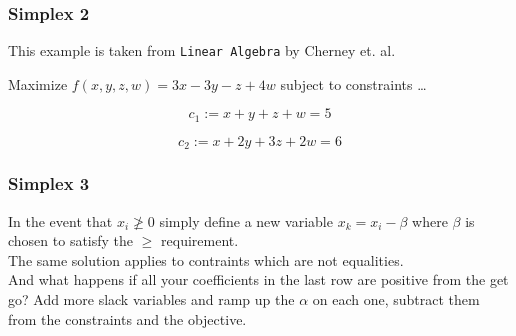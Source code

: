\documentclass{beamer}
\begin{document}
\begin{frame}
\frametitle{Simplex 2}

    This example is taken from \texttt{Linear Algebra} by Cherney et. al.

    \hspace{2cm}

    Maximize $f(x,y,z,w) = 3x - 3y - z + 4w$ subject to constraints \ldots

    \hspace{2cm}

    \begin{equation}
    \label{c1}
        c_{1} := x + y + z + w = 5
    \end{equation}

    \begin{equation}
    \label{c2}
        c_{2} := x + 2y + 3z + 2w = 6 
    \end{equation}

\end{frame}
    
\begin{frame}
\frametitle{Simplex 3}

    In the event that $x_{i} \ngeq 0$ simply define a new variable $x_{k} = x_{i} - \beta$ where $\beta$ is chosen to satisfy the $\geq$ requirement.\\
    The same solution applies to contraints which are not equalities.\\
    And what happens if all your coefficients in the last row are positive from
    the get go? Add more slack variables and ramp up the $\alpha$ on each one,
    subtract them from the constraints and the objective.

\end{frame}
\end{document}
